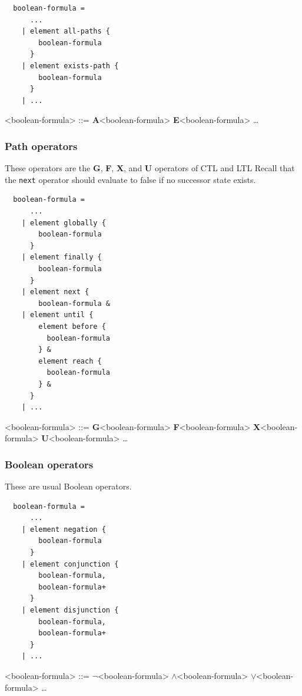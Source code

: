 \documentclass[10pt,english,a4paper]{article}
\newcommand\ctla             {\textbf{A}\xspace}
\newcommand\ctle             {\textbf{E}\xspace}
\newcommand\ltlf             {\textbf{F}\xspace}
\newcommand\ltlg             {\textbf{G}\xspace}
\newcommand\ltlx             {\textbf{X}\xspace}
\newcommand\ltlu             {\textbf{U}\xspace}
\newcommand\logicnot         {\boldmath$\lnot$\xspace}
\newcommand\logicand         {\boldmath$\land$\xspace}
\newcommand\logicor          {\boldmath$\lor$\xspace}
\begin{document}
\begin{multicols}{2}
\begin{lstlisting}
  boolean-formula =
      ...
    | element all-paths {
        boolean-formula
      }
    | element exists-path {
        boolean-formula
      }
    | ...
\end{lstlisting}
\columnbreak
\begin{grammar}
<boolean-formula> ::= \ctla <boolean-formula>
\alt \ctle <boolean-formula>
\alt \ldots
\end{grammar}
\end{multicols}

\subsubsection{Path operators}

These operators are the
\ltlg,
\ltlf,
\ltlx, and
\ltlu
operators of CTL and LTL
Recall that the \lstinline!next! operator should evaluate to false if no
successor state exists.

\begin{multicols}{2}
\begin{lstlisting}
  boolean-formula =
      ...
    | element globally {
        boolean-formula
      }
    | element finally {
        boolean-formula
      }
    | element next {
        boolean-formula &
    | element until {
        element before {
          boolean-formula
        } &
        element reach {
          boolean-formula
        } &
      }
    | ...
\end{lstlisting}
\columnbreak
\setlength{\grammarindent}{10em}
\begin{grammar}
<boolean-formula> ::=
     \ltlg <boolean-formula>
\alt \ltlf <boolean-formula>
\alt \ltlx <boolean-formula>
 \ltlu <boolean-formula>
\alt \ldots
\end{grammar}
\end{multicols}

\subsubsection{Boolean operators}

These are usual Boolean operators.

\begin{multicols}{2}
\begin{lstlisting}
  boolean-formula =
      ...
    | element negation {
        boolean-formula
      }
    | element conjunction {
        boolean-formula,
        boolean-formula+
      }
    | element disjunction {
        boolean-formula,
        boolean-formula+
      }
    | ...
\end{lstlisting}
\columnbreak
\setlength{\grammarindent}{6em}
\begin{grammar}
<boolean-formula> ::=
     \logicnot <boolean-formula>
 \logicand <boolean-formula>
 \logicor <boolean-formula>
\alt \ldots
\end{grammar}
\end{multicols}
\end{document}
